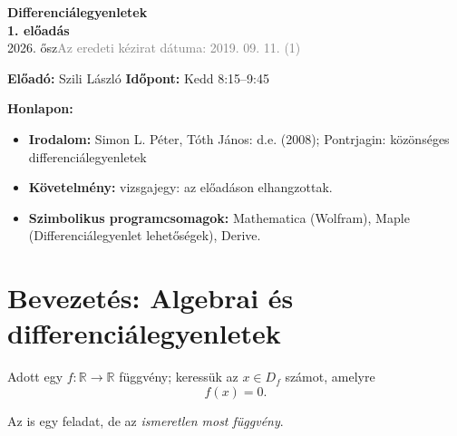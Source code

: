 \begin{center}
{\Large\bfseries\color{ink} Differenciálegyenletek}\\[5pt]
{\large\bfseries 1. előadás}\\[4pt]
{\small 2026. ősz}\qquad\textcolor{graytext}{\small Az eredeti kézirat dátuma: 2019. 09. 11. (1)}
\end{center}

\begin{matbox}
\textbf{Előadó:} Szili László \hfill \textbf{Időpont:} Kedd 8:15--9:45

\textbf{Honlapon:}
\begin{itemize}[leftmargin=1.4em]
\item \textbf{Irodalom:} Simon L. Péter, Tóth János: d.e. (2008); Pontrjagin: közönséges differenciálegyenletek
\item \textbf{Követelmény:} vizsgajegy: az előadáson elhangzottak.
\item \textbf{Szimbolikus programcsomagok:} Mathematica (Wolfram), Maple (Differenciálegyenlet lehetőségek), Derive.
\end{itemize}
\end{matbox}

\section{Bevezetés: Algebrai és differenciálegyenletek}

Adott egy $f\colon\mathbb R\to\mathbb R$ függvény; keressük az
$x\in D_f$ számot, amelyre
\[
 f(x)=0.
\]

Az is egy feladat, de az \emph{ismeretlen most függvény}.

\medskip
\begin{center}
\end{center}

